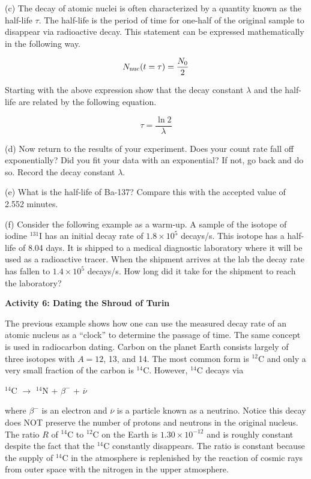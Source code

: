 (c) The decay of atomic nuclei is often characterized by a quantity
known as the half-life \( \tau  \). The half-life is the period of
time for one-half of the original sample to disappear via radioactive
decay. This statement can be expressed mathematically in the following
way.

\[
N_{\rm nuc}(t=\tau )=\frac{N_{0}}{2}\]


Starting with the above expression show that the decay constant \( \lambda  \)
and the half-life are related by the following equation.

\[
\tau =\frac{\ln 2}{\lambda }\]


\vspace{1.5in}

(d) Now return to the results of your experiment.
Does your count rate fall off exponentially?
Did you fit your data with an exponential? If not,
go back and do so.
Record the decay constant $\lambda$.
\answerspace{0.75in}

\pagebreak[2]
(e) What is the half-life of Ba-137? Compare this with the accepted value of 2.552 minutes.
\answerspace{1.5in}

(f) Consider the following example as a warm-up. A sample of the isotope of iodine
\( ^{131} \)I has an initial decay rate of $1.8 \times 10^{5}$ decays/s.
This isotope has a half-life of 8.04 days. It is shipped to a medical
diagnostic laboratory where it will be used as a radioactive tracer.
When the shipment arrives at the lab the decay rate has fallen to
$1.4 \times 10^{5}$ decays/s. How long did it take for the shipment
to reach the laboratory?
\vspace{2in}


\textbf{Activity 6: Dating the Shroud of Turin }

The previous example shows how one can use the measured decay rate
of an atomic nucleus as a {}``clock'' to determine the passage of
time. The same concept is used in radiocarbon dating. Carbon on the
planet Earth consists largely of three isotopes with $A = 12$, 13, and
14. The most common form is \( ^{12} \)C and only a very small fraction
of the carbon is \( ^{14} \)C. However, \( ^{14} \)C decays via 

{\centering \( ^{14} \)C \( \rightarrow  \) \( ^{14} \)N + \( \beta ^{-} \)
+ \( \overline{\nu } \)\par}

where \( \beta ^{-} \) is an electron and \( \overline{\nu } \)
is a particle known as a neutrino. Notice this decay does NOT preserve
the number of protons and neutrons in the original nucleus. The ratio
$R$ of \( ^{14} \)C to \( ^{12} \)C on the Earth is $1.30 \times 10^{-12}$
and is roughly constant despite the fact that the \( ^{14} \)C constantly
disappears. The ratio is constant because the supply of \( ^{14} \)C
in the atmosphere is replenished by the reaction of cosmic rays from
outer space with the nitrogen in the upper atmosphere.

